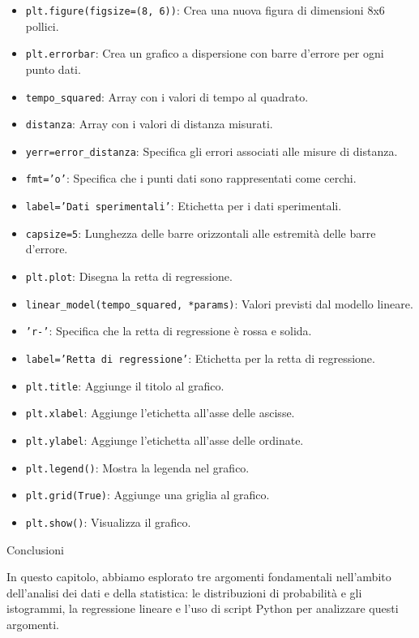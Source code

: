 \documentclass[12pt,a4paper,oneside]{book}
\makeatletter
\renewcommand{\section}{\@startsection{section}{1}{\z@}
{-4ex \@plus -1ex \@minus -.4ex}
{1ex \@plus.2ex }
{\normalfont\large\sffamily\bfseries}}
\theoremstyle{esercizio}
\makeatother
\begin{document}
\begin{itemize}
    \item \texttt{plt.figure(figsize=(8, 6))}: Crea una nuova figura di dimensioni 8x6 pollici.
    \item \texttt{plt.errorbar}: Crea un grafico a dispersione con barre d'errore per ogni punto dati.
    \item \texttt{tempo\_squared}: Array con i valori di tempo al quadrato.
    \item \texttt{distanza}: Array con i valori di distanza misurati.
    \item \texttt{yerr=error\_distanza}: Specifica gli errori associati alle misure di distanza.
    \item \texttt{fmt='o'}: Specifica che i punti dati sono rappresentati come cerchi.
    \item \texttt{label='Dati sperimentali'}: Etichetta per i dati sperimentali.
    \item \texttt{capsize=5}: Lunghezza delle barre orizzontali alle estremità delle barre d'errore.
    \item \texttt{plt.plot}: Disegna la retta di regressione.
    \item \texttt{linear\_model(tempo\_squared, *params)}: Valori previsti dal modello lineare.
    \item \texttt{'r-'}: Specifica che la retta di regressione è rossa e solida.
    \item \texttt{label='Retta di regressione'}: Etichetta per la retta di regressione.
    \item \texttt{plt.title}: Aggiunge il titolo al grafico.
    \item \texttt{plt.xlabel}: Aggiunge l'etichetta all'asse delle ascisse.
    \item \texttt{plt.ylabel}: Aggiunge l'etichetta all'asse delle ordinate.
    \item \texttt{plt.legend()}: Mostra la legenda nel grafico.
    \item \texttt{plt.grid(True)}: Aggiunge una griglia al grafico.
    \item \texttt{plt.show()}: Visualizza il grafico.
\end{itemize}


\section{Conclusioni}

In questo capitolo, abbiamo esplorato tre argomenti fondamentali nell'ambito dell'analisi dei dati e della statistica: le distribuzioni di probabilità e gli istogrammi, la regressione lineare e l'uso di script Python per analizzare questi argomenti. 
\end{document}
